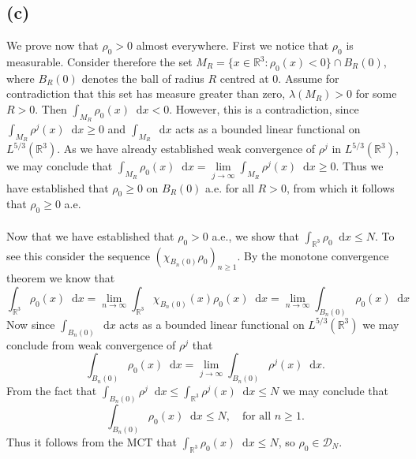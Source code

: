 \documentclass[a4paper,11pt]{article}
\newcommand*\diff{\mathop{}\!\mathrm{d}}
\newcommand{\R}{\mathbb{R}}
\numberwithin{equation}{section}
\begin{document}
\subsection*{(c)}
We prove now that $ \rho_0>0 $ almost everywhere. First we notice that $ \rho_0 $ is measurable. Consider therefore the set $ M_R=\{x\in\R^3 : \rho_0(x)<0\}\cap B_R(0) $, where $ B_R(0) $ denotes the ball of radius $ R $ centred at $ 0 $. Assume for contradiction that this set has measure greater than zero, $ \lambda(M_R)>0 $ for some $ R>0 $. Then $ \int_{M_R}\rho_0(x) \diff x <0$. However, this is a contradiction, since $ \int_{M_R}\rho^j(x) \diff x\geq0 $ and $ \int_{M_R} \diff x $ acts as a bounded linear functional on $ L^{5/3}(\R^3) $. As we have already established weak convergence of $ \rho^j $ in $ L^{5/3}(\R^3) $, we may conclude that $ \int_{M_R}\rho_0(x) \diff x=\lim\limits_{j\to\infty}\int_{M_R}\rho^j(x) \diff x\geq0 $. Thus we have established that $ \rho_0\geq0 $ on $ B_R(0) $ a.e. for all $ R>0 $, from which it follows that $ \rho_0\geq0 $ a.e.\\
\\
Now that we have established that $ \rho_0>0 $ a.e., we show that $ \int_{\R^3}\rho_0 \diff x \leq N $. To see this consider the sequence $( \chi_{B_n(0)}\rho_0)_{n\geq1} $. By the monotone convergence theorem we know that \begin{equation}
\int_{\R^3}\rho_0(x) \diff x=\lim\limits_{n\to\infty}\int_{\R^3}\chi_{B_n(0)}(x)\rho_0(x) \diff x=\lim\limits_{n\to\infty}\int_{B_n(0)}\rho_0(x)\diff x
\end{equation}
Now since $ \int_{B_n(0)}\diff x $ acts as a bounded linear functional on $ L^{5/3}(\R^3) $ we may conclude from weak convergence of $ \rho^j $ that \begin{equation}
\int_{B_n(0)}\rho_0(x)\diff x=\lim\limits_{j\to\infty}\int_{B_n(0)}\rho^j(x)\diff x.
\end{equation}
From the fact that $ \int_{B_n(0)}\rho^j\diff x\leq\int_{\R^3}\rho^j(x)\diff x\leq N $ we may conclude that \begin{equation}
\int_{B_n(0)}\rho_0(x)\diff x\leq N,\quad \text{for all }n\geq1.
\end{equation}
Thus it follows from the MCT that $ \int_{\R^3}\rho_0(x)\diff x\leq N $, so $ \rho_0\in\mathcal{D}_N $.
\end{document}
